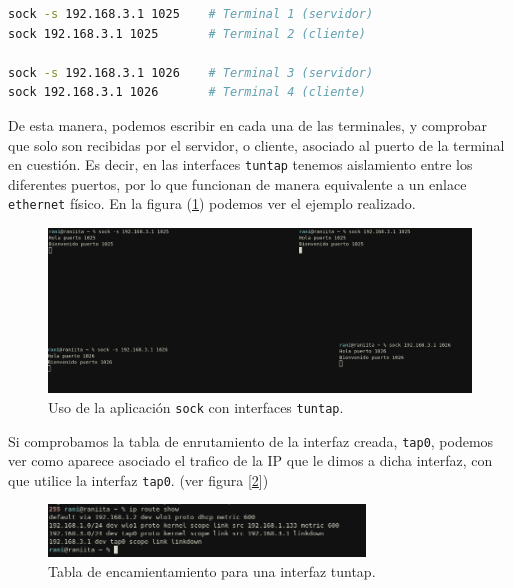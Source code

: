 \documentclass[a4paper, oneside, 12pt]{book}
\begin{document}
	\begin{lstlisting}[language=Bash, caption={Uso de aplicacion \texttt{sock} para crear cliente servidor asociado a un puerto}]
sock -s 192.168.3.1 1025    # Terminal 1 (servidor)
sock 192.168.3.1 1025       # Terminal 2 (cliente)

sock -s 192.168.3.1 1026    # Terminal 3 (servidor)
sock 192.168.3.1 1026       # Terminal 4 (cliente)
	\end{lstlisting}

	\noindent De esta manera, podemos escribir en cada una de las terminales, y comprobar que solo son recibidas por el servidor, o cliente, asociado al puerto de la terminal en cuestión. Es decir, en las interfaces \texttt{tuntap} tenemos aislamiento entre los diferentes puertos, por lo que funcionan de manera equivalente a un enlace \texttt{ethernet} físico. En la figura (\ref{img: ejemplo sock}) podemos ver el ejemplo realizado. \\
	
	\begin{figure}[h!]
		\begin{center}
			\includegraphics[width=1\textwidth]{img/ejemplo_sock.png}
			\caption{Uso de la aplicación \texttt{sock} con interfaces \texttt{tuntap}.}
			\label{img: ejemplo sock}
		\end{center}
	\end{figure}
	
	\noindent Si comprobamos la tabla de enrutamiento de la interfaz creada, \texttt{tap0}, podemos ver como aparece asociado el trafico de la IP que le dimos a dicha interfaz, con que utilice la interfaz \texttt{tap0}. (ver figura [\ref{img: ip route tap}])
	
	\begin{figure}[h!]
		\begin{center}
			\includegraphics[width=0.75\textwidth]{img/tabla_encaminamiento_tuntap.png}
			\caption{Tabla de encamientamiento para una interfaz tuntap.}
			\label{img: ip route tap}
		\end{center}
	\end{figure}
\end{document}
